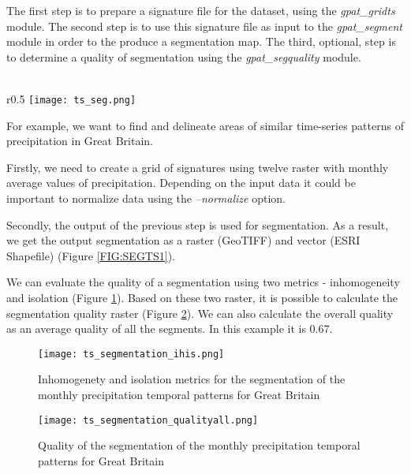 The first step is to prepare a signature file for the dataset, using the {\it gpat\_gridts} module.
The second step is to use this signature file as input to the {\it gpat\_segment} module in order to the produce a segmentation map. 
The third, optional, step is to determine a quality of segmentation using the {\it gpat\_segquality} module.\\\\

\newpage

\begin{wrapfigure}{r}{0.5\textwidth}
	\centering
	\texttt{[image: ts\_seg.png]}
	\caption{Segments of the monthly precipitation temporal patterns for Great Britain}
	\label{FIG:SEGTS1}
\end{wrapfigure}

For example, we want to find and delineate areas of similar time-series patterns of precipitation in Great Britain. 

Firstly, we need to create a grid of signatures using twelve raster with monthly average values of precipitation.
Depending on the input data it could be important to normalize data using the {\it --normalize} option.

Secondly, the output of the previous step is used for segmentation.
As a result, we get the output segmentation as a raster (GeoTIFF) and vector (ESRI Shapefile) (Figure \ref{FIG:SEGTS1}).

We can evaluate the quality of a segmentation using two metrics - inhomogeneity and isolation (Figure \ref{FIG:SEGTS2}).
Based on these two raster, it is possible to calculate the segmentation quality raster (Figure \ref{FIG:SEGTS3}).
We can also calculate the overall quality as an average quality of all the segments.
In this example it is 0.67.

\begin{figure}[H]
	\centering
	\texttt{[image: ts\_segmentation\_ihis.png]}
	\caption{Inhomogenety and isolation metrics for the segmentation of the monthly precipitation temporal patterns for Great Britain}
	\label{FIG:SEGTS2}
\end{figure}

\begin{figure}[H]
	\centering
	\texttt{[image: ts\_segmentation\_qualityall.png]}
	\caption{Quality of the segmentation of the monthly precipitation temporal patterns for Great Britain}
	\label{FIG:SEGTS3}
\end{figure}

